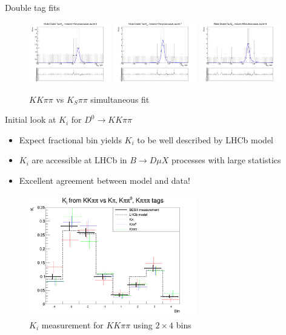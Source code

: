 \documentclass{beamer}
\begin{document}
\begin{frame}{Double tag fits}
\begin{figure}
    \includegraphics[width=0.32\textwidth, clip = true, trim = {0 11cm 0 0}]{Plots/DoubleTagYield_DoubleTag_SCMB_KKpipi_vs_KSpipi_SignalBin0_TagBin6.png}
    \includegraphics[width=0.32\textwidth, clip = true, trim = {0 11cm 0 0}]{Plots/DoubleTagYield_DoubleTag_SCMB_KKpipi_vs_KSpipi_SignalBin0_TagBin7.png}
    \includegraphics[width=0.32\textwidth, clip = true, trim = {0 11cm 0 0}]{Plots/DoubleTagYield_DoubleTag_SCMB_KKpipi_vs_KSpipi_SignalBin0_TagBin8.png}
    \caption{$KK\pi\pi$ vs $K_S\pi\pi$ simultaneous fit}
  \end{figure}
\end{frame}

\begin{frame}{Initial look at $K_i$ for $D^0\to KK\pi\pi$}
  \begin{itemize}
    \item{Expect fractional bin yields $K_i$ to be well described by LHCb model}
    \item{$K_i$ are accessible at LHCb in $B\to D\mu X$ processes with large statistics}
    \item{Excellent agreement between model and data!}
  \end{itemize}
  \begin{figure}
    \centering
    \includegraphics[width=0.65\textwidth]{Plots/Ki_Measured_vs_Model.png}
    \caption{$K_i$ measurement for $KK\pi\pi$ using $2\times 4$ bins}
  \end{figure}
\end{frame}
\end{document}
